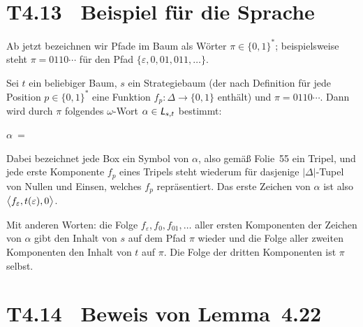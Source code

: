 \documentclass[fontsize=11pt, twoside=false, numbers=autoenddot]{scrbook}
\begin{document}
\section*{T4.13~ {\boldmath Beispiel für die Sprache \Lst}}

Ab jetzt bezeichnen wir Pfade im Baum als Wörter $\pi \in \{0,1\}^*$;
beispielsweise steht $\pi = 0110\cdots$
für den Pfad $\{\varepsilon,0,01,011,\dots\}$.

Sei $t$ ein beliebiger Baum, $s$ ein Strategiebaum (der nach Definition
für jede Position $p \in \{0,1\}^*$ eine Funktion $f_p : \Delta \to \{0,1\}$ enthält)
und $\pi = 0110\cdots$.
Dann wird durch $\pi$ folgendes $\omega$-Wort $\alpha \in \textsf{\textit{L}}_{s,t}$ bestimmt:
%
\begin{center}
  $\alpha ~=~ {}$
  \newcommand{\Tripel}[3]{
    ~\begin{tabular}{@{}c@{}}#1\\[3pt]#2\\[3pt]#3\end{tabular}\,%
  }%
\end{center}
%
Dabei bezeichnet jede Box ein Symbol von $\alpha$, also gemäß Folie~55 ein Tripel,
und jede erste Komponente $f_p$ eines Tripels
steht wiederum für dasjenige $|\Delta|$-Tupel von Nullen und Einsen,
welches $f_p$ repräsentiert.
Das erste Zeichen von $\alpha$ ist also $\big\langle f_\varepsilon,t(\varepsilon),0\big\rangle$.

Mit anderen Worten: die Folge $f_\varepsilon,f_0,f_{01},\dots$
aller ersten Komponenten der Zeichen von $\alpha$ gibt den Inhalt von $s$
auf dem Pfad $\pi$ wieder und die Folge aller zweiten Komponenten 
den Inhalt von $t$ auf $\pi$. Die Folge der dritten Komponenten
ist $\pi$ selbst.

\goodbreak
\section*{T4.14~ Beweis von Lemma~4.22}
\end{document}
